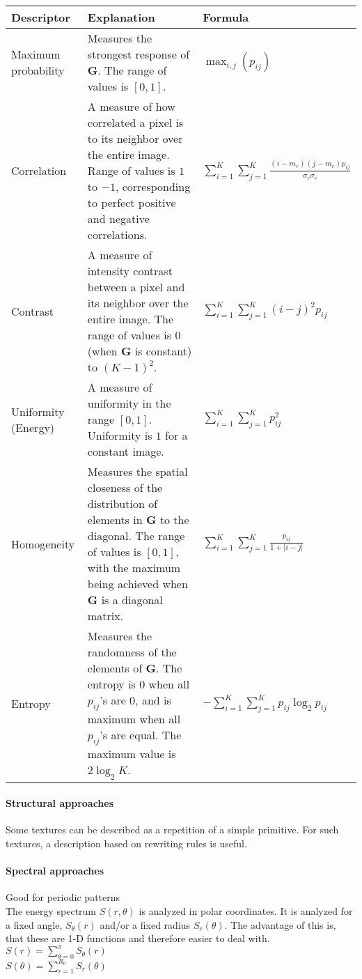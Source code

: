 \begin{table}[h]
	\begin{tabularx}{\textwidth}{lXl}
		\textbf{Descriptor} & \textbf{Explanation} & \textbf{Formula} \\ \hline
		Maximum probability & Measures the strongest response of $\mathbf{G}$. The range of values is $[0,1]$. & $\displaystyle\max_{i,j}(p_{ij})$ \\
		Correlation & A measure of how correlated a pixel is to its neighbor over the entire image. Range of values is $1$ to $-1$, corresponding to perfect positive and negative correlations. & $\displaystyle\sum\limits_{i=1}^{K}\sum\limits_{j=1}^{K}\frac{(i-m_r)(j-m_c)p_{ij}}{\sigma_r \sigma_c}$ \\
		Contrast & A measure of intensity contrast between a pixel and its neighbor over the entire image. The range of values is $0$ (when $\mathbf{G}$ is constant) to $(K-1)^2$. & $\displaystyle\sum\limits_{i=1}^{K}\sum\limits_{j=1}^{K}(i-j)^2 p_{ij}$ \\
		Uniformity (Energy) & A measure of uniformity in the range $[0,1]$. Uniformity is $1$ for a constant image. & $\displaystyle\sum\limits_{i=1}^{K}\sum\limits_{j=1}^{K} p_{ij}^2$ \\
		Homogeneity & Measures the spatial closeness of the distribution of elements in $\mathbf{G}$ to the diagonal. The range of values is $[0,1]$, with the maximum being achieved when $\mathbf{G}$ is a diagonal matrix. & $\displaystyle\sum\limits_{i=1}^{K}\sum\limits_{j=1}^{K}\frac{p_{ij}}{1+|i-j|}$ \\
		Entropy & Measures the randomness of the elements of $\mathbf{G}$. The entropy is $0$ when all $p_{ij}$'s are $0$, and is maximum when all $p_{ij}$'s are equal. The maximum value is $2 \log_2 K$. & $\displaystyle -\sum\limits_{i=1}^{K}\sum\limits_{j=1}^{K} p_{ij} \log_2 p_{ij}$ \\
		\hline
	\end{tabularx}
\end{table}


\paragraph{Structural approaches}
Some textures can be described as a repetition of a simple primitive. For such textures, a description based on rewriting rules is useful.

\paragraph{Spectral approaches}
Good for periodic patterns\\
The energy spectrum $S(r,\theta)$ is analyzed in polar coordinates. It is analyzed for a fixed angle, $S_\theta(r)$ and/or a fixed radius $S_r(\theta)$. The advantage of this is, that these are 1-D functions and therefore easier to deal with.\\
$S(r)=\sum\limits_{\theta = 0}^{\pi}S_\theta(r)$\\
$S(\theta)=\sum\limits_{r=1}^{R_0}S_r(\theta)$\\
